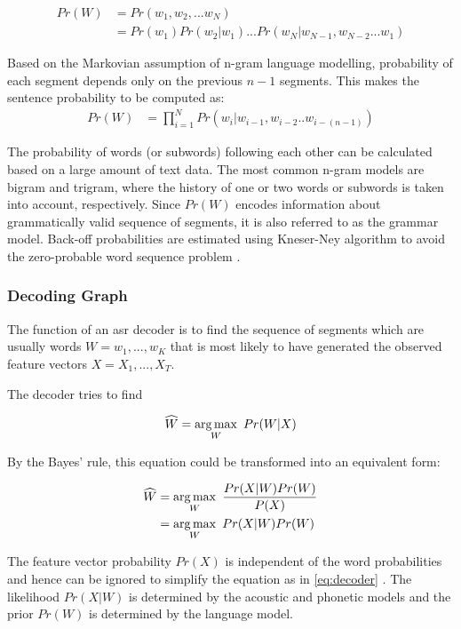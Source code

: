\begin{align}
	Pr(W) & = Pr(w_1,w_2,... w_N)                              \\
	     & = Pr(w_1)Pr(w_2|w_1)...Pr(w_N|w_{N-1},w_{N-2}...w_1)
\end{align}

Based on the Markovian assumption of n-gram language modelling, probability of
each segment depends only on the previous $n-1$ segments. This makes the
sentence probability to be computed as:
\begin{align}
	Pr(W) & = \prod_{i = 1}^{N} Pr(w_i |w_{i-1},w_{i-2}..w_{i-(n-1)})
\end{align}

The probability of words (or subwords) following each other can be
calculated based on a large amount of text data. The most common n-gram models
are bigram and trigram, where the history of one or two words or subwords is
taken into account, respectively. Since $Pr(W)$ encodes information about grammatically valid sequence of segments, it is also referred to as the grammar model. Back-off probabilities are estimated using
Kneser-Ney algorithm to avoid the zero-probable word sequence problem
\cite{Kneysmoothing1995}.

\subsubsection{Decoding Graph}

The function of an \gls{asr} decoder is to find the sequence of segments which are usually words $W=w_1 ,	. . ., w_K$ that is most likely to have generated the observed feature vectors
${X}=X_1, . . . , X_T$. 

The decoder tries to find

\begin{equation}
	\widehat{W}=\argmax_W\ Pr(W|{X})
\end{equation}

By the Bayes’ rule, this equation could be transformed into an equivalent form:

\begin{align}
	\widehat{W} & = \argmax_W\ \frac{Pr({X}|W)Pr(W)}{P({X})}       \\
	            & = \argmax_W\ Pr({X}|W)Pr(W) \label{eq:decoder}
\end{align}

The feature vector probability $Pr({X})$ is independent of the word probabilities
and hence can be ignored to simplify the equation as in \ref{eq:decoder}
\cite{benesty2008springer}. The likelihood $Pr({X}|W)$ is determined by the
acoustic and phonetic models and the prior $Pr(W)$ is determined by the language model. 

